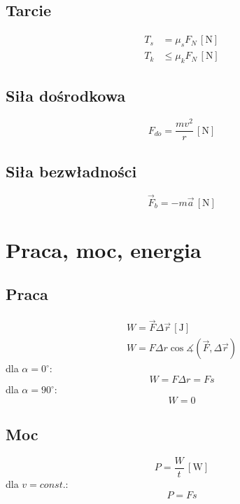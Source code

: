 \documentclass{report}
\numberwithin{equation}{chapter}
\newcommand{\unit}[1]{\,\left[\mathrm{#1}\right]}
\begin{document}
      \section{Tarcie}
        \begin{align}
          T_s &= \mu_sF_N \unit{N}\\
          T_k &\leqslant \mu_kF_N \unit{N}
        \end{align}
      \section{Siła dośrodkowa}
        \begin{equation}
          F_{do} = \frac{mv^2}{r} \unit{N}
        \end{equation}
        \section{Siła bezwładności}
        \begin{equation}
          \vec F_b = -m\vec a \unit{N}
        \end{equation}

  \newpage
  \chapter{Praca, moc, energia}
    \section{Praca}
      \begin{gather}
        W = \vec F\Delta\vec r \unit{J}\\
        W = F\Delta r \cos\measuredangle(\vec F, \Delta\vec r)
      \end{gather}
      dla $\alpha = 0^\circ$:
      \begin{equation}
        W = F\Delta r = Fs
      \end{equation}
      dla $\alpha = 90^\circ$:
      \begin{equation}
        W = 0
      \end{equation}
    \section{Moc}
      \begin{equation}
        P = \frac{W}{t} \unit{W}
      \end{equation}
      dla $v = const.$:
      \begin{equation}
        P = Fs
      \end{equation}
\end{document}
